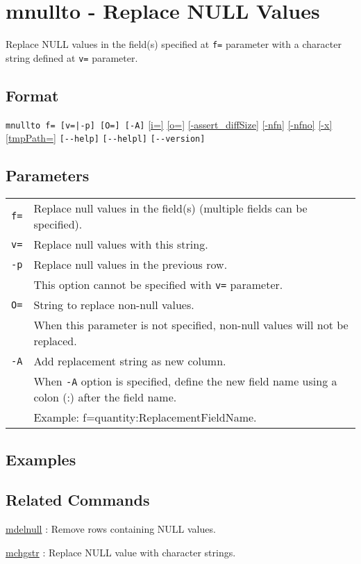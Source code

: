 
%

\section{mnullto - Replace NULL Values\label{sect:mnullto}}
Replace NULL values in the field(s) specified at \verb|f=| parameter with a character string defined at \verb|v=| parameter. 


\subsection*{Format}
\verb/mnullto f= [v=|-p] [O=] [-A]/
\hyperref[sect:option_i]{[i=]}
\hyperref[sect:option_o]{[o=]}
\hyperref[sect:option_assert_diffSize]{[-assert\_diffSize]}
\hyperref[sect:option_nfn]{[-nfn]} 
\hyperref[sect:option_nfno]{[-nfno]}  
\hyperref[sect:option_x]{[-x]}
\hyperref[sect:option_option_tmppath]{[tmpPath=]}
\verb|[--help]|
\verb|[--helpl]|
\verb|[--version]|\\

\subsection*{Parameters}
\begin{table}[htbp]
{\small
\begin{tabular}{ll}
\verb|f=|  & Replace null values in the field(s) (multiple fields can be specified). \\
\verb|v=|  & Replace null values with this string. \\
\verb|-p|  & Replace null values in the previous row. \\
           &  This option cannot be specified with \verb|v=| parameter. \\
\verb|O=|  & String to replace non-null values. \\
		& When this parameter is not specified, non-null values will not be replaced. \\
\verb|-A|  & Add replacement string as new column. \\
           & When \verb|-A| option is specified, define the new field name using a colon (:) after the field name.\\
           & Example: f=quantity:ReplacementFieldName. \\
\end{tabular} 
}
\end{table} 

\subsection*{Examples}

\subsection*{Related Commands}
\hyperref[sect:mdelnull]{mdelnull} : Remove rows containing NULL values. 

\hyperref[sect:mchgstr]{mchgstr} : Replace NULL value with character strings. 
%
